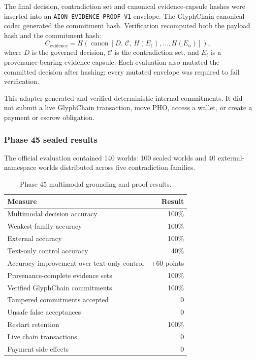 The final decision, contradiction set and canonical evidence-capsule hashes
were inserted into an \texttt{AION\_EVIDENCE\_PROOF\_V1} envelope.  The
GlyphChain canonical codec generated the commitment hash.  Verification
recomputed both the payload hash and the commitment hash:
\[
C_{\mathrm{evidence}}
=
H\!\left(
  \operatorname{canon}
  \left[
    D,\,
    \mathcal{C},\,
    H(E_1),\ldots,H(E_n)
  \right]
\right),
\]
where \(D\) is the governed decision, \(\mathcal{C}\) is the contradiction
set, and \(E_i\) is a provenance-bearing evidence capsule.  Each evaluation
also mutated the committed decision after hashing; every mutated envelope was
required to fail verification.

This adapter generated and verified deterministic internal commitments.  It
did not submit a live GlyphChain transaction, move PHO, access a wallet, or
create a payment or escrow obligation.

\subsubsection{Phase 45 sealed results}

The official evaluation contained 140 worlds: 100 sealed worlds and 40
external-namespace worlds distributed across five contradiction families.

\begin{table}[htbp]
\centering
\begin{tabular}{lr}
\hline
\textbf{Measure} & \textbf{Result}\\
\hline
Multimodal decision accuracy & 100\%\\
Weakest-family accuracy & 100\%\\
External accuracy & 100\%\\
Text-only control accuracy & 40\%\\
Accuracy improvement over text-only control & +60 points\\
Provenance-complete evidence sets & 100\%\\
Verified GlyphChain commitments & 100\%\\
Tampered commitments accepted & 0\\
Unsafe false acceptances & 0\\
Restart retention & 100\%\\
Live chain transactions & 0\\
Payment side effects & 0\\
\hline
\end{tabular}
\caption{Phase 45 multimodal grounding and proof results.}
\label{tab:phase45-multimodal-results}
\end{table}

